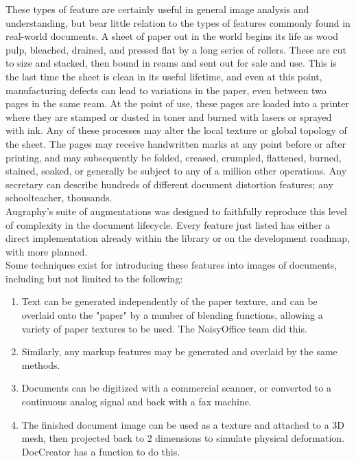 \documentclass[runningheads]{llncs}
\begin{document}
These types of feature are certainly useful in general image analysis and understanding, but bear little relation to the types of features commonly found in real-world documents. A sheet of paper out in the world begins its life as wood pulp, bleached, drained, and pressed flat by a long series of rollers. These are cut to size and stacked, then bound in reams and sent out for sale and use. This is the last time the sheet is clean in its useful lifetime, and even at this point, manufacturing defects can lead to variations in the paper, even between two pages in the same ream. At the point of use, these pages are loaded into a printer where they are stamped or dusted in toner and burned with lasers or sprayed with ink. Any of these processes may alter the local texture or global topology of the sheet. The pages may receive handwritten marks at any point before or after printing, and may subsequently be folded, creased, crumpled, flattened, burned, stained, soaked, or generally be subject to any of a million other operations. Any secretary can describe hundreds of different document distortion features; any schoolteacher, thousands.\\

Augraphy's suite of augmentations was designed to faithfully reproduce this level of complexity in the document lifecycle. Every feature just listed has either a direct implementation already within the library or on the development roadmap, with more planned.\\

Some techniques exist for introducing these features into images of documents, including but not limited to the following:
\begin{enumerate}
\item Text can be generated independently of the paper texture, and can be overlaid onto the "paper" by a number of blending functions, allowing a variety of paper textures to be used. The NoisyOffice team did this.
\item Similarly, any markup features may be generated and overlaid by the same methods.
\item Documents can be digitized with a commercial scanner, or converted to a continuous analog signal and back with a fax machine.
\item The finished document image can be used as a texture and attached to a 3D mesh, then projected back to 2 dimensions to simulate physical deformation. DocCreator has a function to do this.
\end{enumerate}
\end{document}
